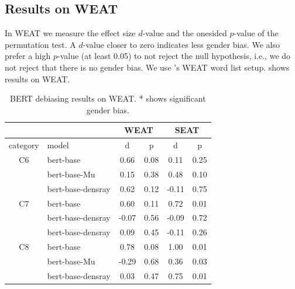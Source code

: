 \subsection{Results on WEAT}
In WEAT we measure the effect size $d$-value and the
onesided $p$-value of the permutation test.  A $d$-value
closer to zero indicates less gender bias.  We also prefer a
high $p$-value (at least 0.05) to not reject the null
hypothesis, i.e., we do not reject that there is no gender
bias. We use \citet{karve2019conceptor}'s WEAT word list
setup.
 shows
results on WEAT.




\begin{table}[ht]
\centering
\scriptsize
\begin{tabular}{clcccc}
\hline
&&\multicolumn{2}{c}{WEAT}&\multicolumn{2}{c}{SEAT}\\
\hline
category & model & d & p& d & p\\
\hline
C6 & bert-base & 0.66 & 0.08 &0.11&0.25\\
& bert-base-Mu & 0.15 & 0.38&0.48&0.10\\
&bert-base-densray & 0.62 & 0.12&-0.11&0.75\\
\hline
C7 & bert-base & 0.60 & 0.11 &0.72&0.01\\
& bert-base-densray & -0.07 & 0.56&-0.09&0.72\\
& bert-base-densray & 0.09 & 0.45&-0.11&0.26\\
\hline
C8& bert-base & 0.78 & 0.08 &1.00&0.01\\
& bert-base-Mu & -0.29 & 0.68&0.36&0.03\\
& bert-base-densray & 0.03 & 0.47&0.75&0.01\\

\hline
\end{tabular}
\caption{
BERT debiasing results on WEAT. * shows significant gender bias.}
\end{table}

